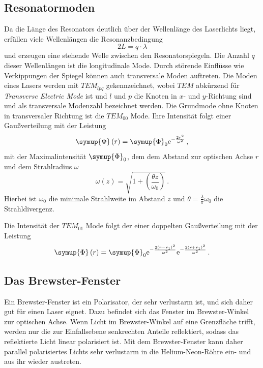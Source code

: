 \subsection*{Resonatormoden}
Da die Länge des Resonators deutlich über der Wellenlänge des Laserlichts liegt, erfüllen viele Wellenlängen die 
Resonanzbedingung 
\begin{equation*}
    2 L = q \cdot \lambda 
\end{equation*}
und erzeugen eine stehende Welle zwischen den Resonatorspiegeln. Die Anzahl $q$ dieser Wellenlängen ist die longitudinale
Mode. Durch störende Einflüsse wie Verkippungen der Spiegel können auch transversale Moden auftreten.
Die Moden eines Lasers werden mit $TEM_{lpq}$ gekennzeichnet, wobei $TEM$ abkürzend für \textit{Transverse Electric Mode} ist
und $l$ und $p$ die Knoten in $x$- und $y$-Richtung sind und als transversale Modenzahl bezeichnet werden.
Die Grundmode ohne Knoten in transversaler Richtung ist die $TEM_{00}$ Mode. Ihre Intensität folgt einer
Gaußverteilung mit der Leistung
\begin{equation*}
    \symup{\Phi} \left(r\right) = \symup{\Phi}_0 \text{e}^{-\frac{2 r^2}{\omega^2}} \, ,
\end{equation*}
mit der Maximalintensität $\symup{\Phi}_0$, dem dem Abstand zur optischen Achse $r$ und dem Strahlradius $\omega$
\begin{equation*}
    \omega \left(z\right) = \sqrt{1 + \left(\frac{\theta z}{\omega_0}\right)} \, .
\end{equation*}
Hierbei ist $\omega_0$ die minimale Strahlweite im Abstand $z$ und $\theta = \frac{\lambda}{\pi} \omega_0$ die Strahldivergenz.

Die Intensität der $TEM_{01}$ Mode folgt der einer doppelten Gaußverteilung mit der Leistung
\begin{equation*}
    \symup{\Phi} \left(r\right) = \symup{\Phi}_0 \text{e}^{- \frac{2 \left(r - r_1\right)^2}{\omega^2}} \text{e}^{- \frac{2 \left(r + r_1\right)^2}{\omega^2}} \, .
\end{equation*}

\subsection*{Das Brewster-Fenster}
Ein Brewster-Fenster ist ein Polarisator, der sehr verlustarm ist, und sich daher gut für einen Laser eignet.
Dazu befindet sich das Fenster im Brewster-Winkel zur optischen Achse. Wenn Licht im Brewster-Winkel auf eine Grenzfläche
trifft, werden nur die zur Einfallsebene senkrechten Anteile reflektiert, sodass das reflektierte Licht linear polarisiert 
ist. Mit dem Brewster-Fenster kann daher parallel polarisiertes Lichts sehr verlustarm in die Helium-Neon-Röhre ein- und aus ihr wieder austreten.

